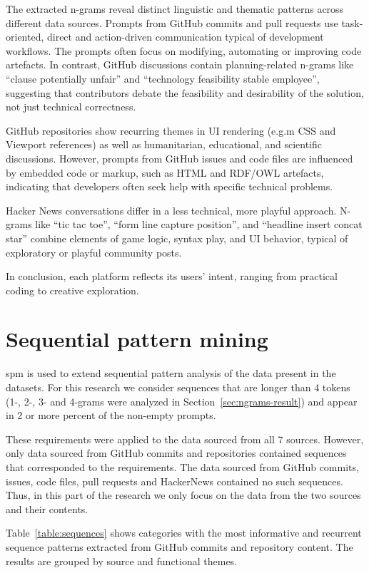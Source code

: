 The extracted n-grams reveal distinct linguistic and thematic patterns across different data sources. Prompts from GitHub commits and pull requests use task-oriented, direct and action-driven communication typical of development workflows. The prompts often focus on modifying, automating or improving code artefacts. In contrast, GitHub discussions contain planning-related n-grams like ``clause potentially unfair'' and ``technology feasibility stable employee'', suggesting that contributors debate the feasibility and desirability of the solution, not just technical correctness. 

GitHub repositories show recurring themes in UI rendering (e.g.m CSS and Viewport references) as well as humanitarian, educational, and scientific discussions. However, prompts from GitHub issues and code files are influenced by embedded code or markup, such as HTML and RDF/OWL artefacts, indicating that developers often seek help with specific technical problems.

Hacker News conversations differ in a less technical, more playful approach. N-grams like ``tic tac toe'', ``form line capture position'', and ``headline insert concat star'' combine elements of game logic, syntax play, and UI behavior, typical of exploratory or playful community posts.

In conclusion, each platform reflects its users' intent, ranging from practical coding to creative exploration.

\section{Sequential pattern mining}\label{sec:spm-results}
\Acrfull{spm} is used to extend sequential pattern analysis of the data present in the datasets. For this research we consider sequences that are longer than 4 tokens (1-, 2-, 3- and 4-grams were analyzed in Section~\ref{sec:ngrams-result}) and appear in 2 or more percent of the non-empty prompts. 

These requirements were applied to the data sourced from all 7 sources. However, only data sourced from GitHub commits and repositories contained sequences that corresponded to the requirements. The data sourced from GitHub commits, issues, code files, pull requests and HackerNews contained no such sequences. Thus, in this part of the research we only focus on the data from the two sources and their contents. 

Table~\ref{table:sequences} shows categories with the most informative and recurrent sequence patterns extracted from GitHub commits and repository content. The results are grouped by source and functional themes.


